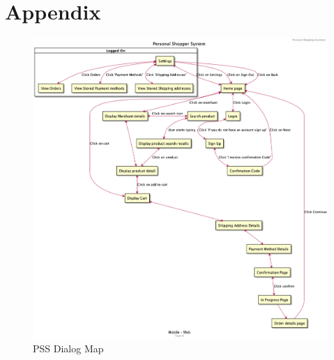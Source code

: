 \section{Appendix}

\begin{figure}[h]
    \includegraphics[scale=0.32]{../images/pss.png}
    \caption{PSS Dialog Map}
    \label{fig:pss}
\end{figure}

